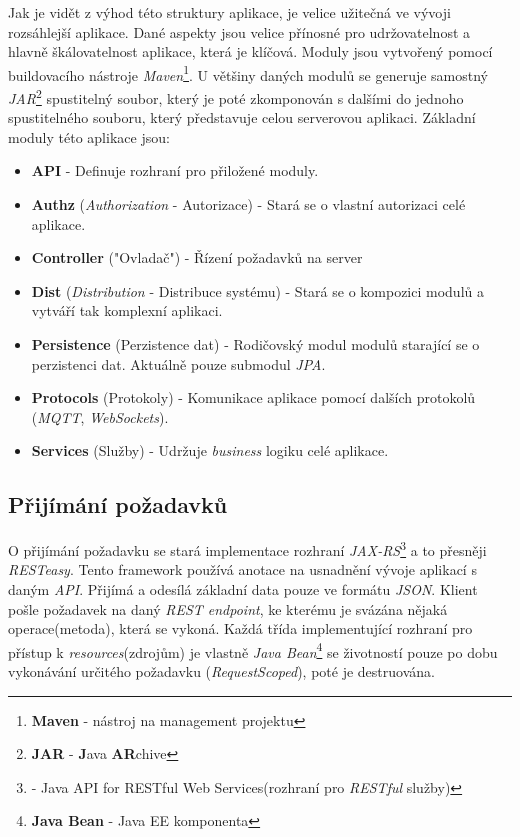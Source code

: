 Jak je vidět z výhod této struktury aplikace, je velice užitečná ve vývoji rozsáhlejší aplikace.
Dané aspekty jsou velice přínosné pro udržovatelnost a hlavně škálovatelnost aplikace, která je klíčová.
Moduly jsou vytvořený pomocí buildovacího nástroje \emph{Maven}\footnote{\textbf{Maven} - nástroj na management projektu}.
U většiny daných modulů se generuje samostný \emph{JAR}\footnote{\textbf{JAR} - \textbf{J}ava \textbf{AR}chive} spustitelný soubor, který je poté zkomponován s dalšími do jednoho spustitelného souboru, který představuje celou serverovou aplikaci.
\newline
Základní moduly této aplikace jsou:
\begin{itemize}
  \item \textbf{API} - Definuje rozhraní pro přiložené moduly.
  \item \textbf{Authz} (\emph{Authorization} - Autorizace) - Stará se o vlastní autorizaci celé aplikace.
  \item \textbf{Controller} ("Ovladač") - Řízení požadavků na server
  \item \textbf{Dist} (\emph{Distribution} - Distribuce systému) - Stará se o kompozici modulů a vytváří tak komplexní aplikaci.
  \item \textbf{Persistence} (Perzistence dat) - Rodičovský modul modulů starající se o perzistenci dat. Aktuálně pouze submodul \emph{JPA}.
  \item \textbf{Protocols} (Protokoly) - Komunikace aplikace pomocí dalších protokolů (\emph{MQTT}, \emph{WebSockets}).
  \item \textbf{Services} (Služby) - Udržuje \emph{business} logiku celé aplikace.
\end{itemize}

\subsection*{Přijímání požadavků}
\label{impl:backend:request}
O přijímání požadavku se stará implementace rozhraní \emph{JAX-RS}\footnote{ - Java API for RESTful Web Services(rozhraní pro \emph{RESTful} služby)} a to přesněji \emph{RESTeasy}.
Tento framework používá anotace na usnadnění vývoje aplikací s daným \emph{API}.
Přijímá a odesílá základní data pouze ve formátu \emph{JSON}.
Klient pošle požadavek na daný \emph{REST endpoint}, ke kterému je svázána nějaká operace(metoda), která se vykoná.
Každá třída implementující rozhraní pro přístup k \emph{resources}(zdrojům) je vlastně \emph{Java Bean}\footnote{\textbf{Java Bean} - Java EE komponenta} se životností pouze po dobu vykonávání určitého požadavku (\emph{RequestScoped}), poté je destruována.

